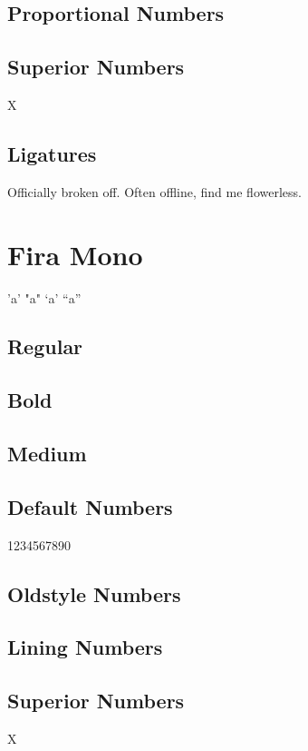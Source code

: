 \documentclass{article}
\begin{document}
\subsection*{Proportional Numbers}

{}

\subsection*{Superior Numbers}

X{}

\subsection*{Ligatures}


Officially broken off. Often offline, find me flowerless.

\section*{Fira Mono}
\ttfamily


'a' \quad "a" \quad `a' \quad ``a''

\subsection*{Regular}

\lipsum[1]


\subsection*{Bold}
\ttfamily

\textbf{\lipsum[3]}

\subsection*{Medium}
{\firamonomedium\lipsum[8]}

\subsection*{Default Numbers}

1234567890

\subsection*{Oldstyle Numbers}

{}

\subsection*{Lining Numbers}

{}

\subsection*{Superior Numbers}

X{}
\end{document}
